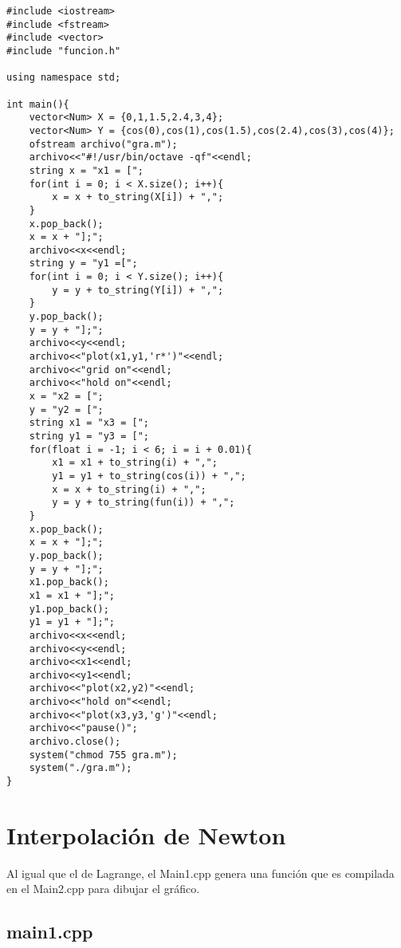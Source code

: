 \documentclass[a4paper,12pt]{article}
\begin{document}
\begin{lstlisting}
#include <iostream>
#include <fstream>
#include <vector>
#include "funcion.h"

using namespace std;

int main(){
	vector<Num> X = {0,1,1.5,2.4,3,4};
	vector<Num> Y = {cos(0),cos(1),cos(1.5),cos(2.4),cos(3),cos(4)};
	ofstream archivo("gra.m");
	archivo<<"#!/usr/bin/octave -qf"<<endl;
	string x = "x1 = [";
	for(int i = 0; i < X.size(); i++){
		x = x + to_string(X[i]) + ",";
	}
	x.pop_back();
	x = x + "];";
	archivo<<x<<endl;
	string y = "y1 =[";
	for(int i = 0; i < Y.size(); i++){
		y = y + to_string(Y[i]) + ",";
	}
	y.pop_back();
	y = y + "];";
	archivo<<y<<endl;
	archivo<<"plot(x1,y1,'r*')"<<endl;
	archivo<<"grid on"<<endl;
	archivo<<"hold on"<<endl;
	x = "x2 = [";
	y = "y2 = [";
	string x1 = "x3 = [";
	string y1 = "y3 = [";
	for(float i = -1; i < 6; i = i + 0.01){
		x1 = x1 + to_string(i) + ",";
		y1 = y1 + to_string(cos(i)) + ",";
		x = x + to_string(i) + ",";
		y = y + to_string(fun(i)) + ",";
	}
	x.pop_back();
	x = x + "];";
	y.pop_back();
	y = y + "];";
	x1.pop_back();
	x1 = x1 + "];";
	y1.pop_back();
	y1 = y1 + "];";
	archivo<<x<<endl;
	archivo<<y<<endl;
	archivo<<x1<<endl;
	archivo<<y1<<endl;
	archivo<<"plot(x2,y2)"<<endl;
	archivo<<"hold on"<<endl;
	archivo<<"plot(x3,y3,'g')"<<endl;
	archivo<<"pause()";
	archivo.close();
	system("chmod 755 gra.m");
	system("./gra.m");
}
\end{lstlisting}

\section{Interpolación de Newton}

Al igual que el de Lagrange, el Main1.cpp genera una función que es compilada en el Main2.cpp para dibujar el gráfico.

\subsection{main1.cpp}
\end{document}
